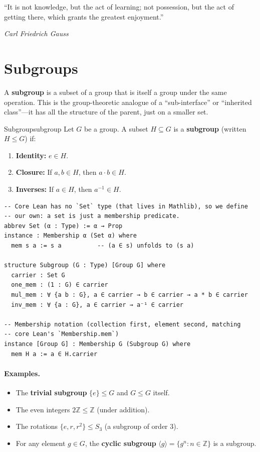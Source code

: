 \documentclass[11pt, a4paper, oneside]{book}
\newcommand{\Z}{\mathbb{Z}}
\begin{document}
\epigraph{``It is not knowledge, but the act of learning; not possession, but
the act of getting there, which grants the greatest enjoyment.''}%
{\textit{Carl Friedrich Gauss}}

\section{Subgroups}

A \textbf{subgroup} is a subset of a group that is itself a group under the
same operation. This is the group-theoretic analogue of a ``sub-interface''
or ``inherited class''---it has all the structure of the parent, just on
a smaller set.

\begin{defn}{Subgroup}{subgroup}
Let $G$ be a group. A subset $H \subseteq G$ is a \textbf{subgroup} (written
$H \leq G$) if:
\begin{enumerate}[nosep, label=(\roman*)]
\item \textbf{Identity:} $e \in H$.
\item \textbf{Closure:} If $a, b \in H$, then $a \cdot b \in H$.
\item \textbf{Inverses:} If $a \in H$, then $a^{-1} \in H$.
\end{enumerate}
\end{defn}

\begin{leanbox}
\begin{verbatim}
-- Core Lean has no `Set` type (that lives in Mathlib), so we define
-- our own: a set is just a membership predicate.
abbrev Set (α : Type) := α → Prop
instance : Membership α (Set α) where
  mem s a := s a          -- (a ∈ s) unfolds to (s a)

structure Subgroup (G : Type) [Group G] where
  carrier : Set G
  one_mem : (1 : G) ∈ carrier
  mul_mem : ∀ {a b : G}, a ∈ carrier → b ∈ carrier → a * b ∈ carrier
  inv_mem : ∀ {a : G}, a ∈ carrier → a⁻¹ ∈ carrier

-- Membership notation (collection first, element second, matching
-- core Lean's `Membership.mem`)
instance [Group G] : Membership G (Subgroup G) where
  mem H a := a ∈ H.carrier
\end{verbatim}
\end{leanbox}

\paragraph{Examples.}
\begin{itemize}[nosep]
\item The \textbf{trivial subgroup} $\{e\} \leq G$ and $G \leq G$ itself.
\item The even integers $2\Z \leq \Z$ (under addition).
\item The rotations $\{e, r, r^2\} \leq S_3$ (a subgroup of order 3).
\item For any element $g \in G$, the \textbf{cyclic subgroup}
      $\langle g \rangle = \{g^n : n \in \Z\}$ is a subgroup.
\end{itemize}
\end{document}
